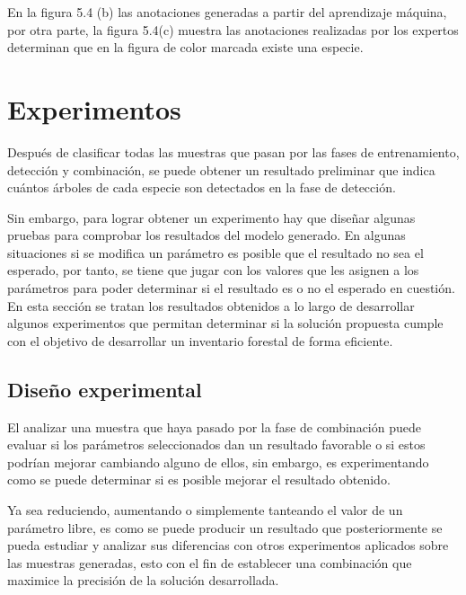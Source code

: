 En la figura 5.4 (b) las anotaciones generadas a partir del aprendizaje máquina, por otra parte, la figura 5.4(c) muestra  las anotaciones realizadas por los expertos determinan que en la figura de color marcada existe una especie.

\chapter{Experimentos}
Después de clasificar todas las muestras que pasan por las fases de entrenamiento, detección y combinación, se puede obtener un resultado preliminar que indica  cuántos árboles de cada especie son detectados en la fase de detección.

Sin embargo, para lograr obtener un experimento hay que diseñar algunas pruebas para comprobar los resultados del modelo generado. En algunas situaciones si se modifica un parámetro es posible que el resultado no sea el esperado, por tanto, se tiene que jugar con los valores que les asignen a los parámetros para poder determinar si el resultado es o no el esperado en cuestión. En esta sección se tratan los resultados obtenidos a lo largo de desarrollar algunos experimentos que permitan determinar si la solución propuesta cumple con el objetivo de desarrollar un inventario forestal de forma eficiente.
\clearpage

\section{Diseño experimental}
El analizar una muestra que haya pasado por la fase de combinación puede evaluar si los parámetros seleccionados dan un resultado favorable o si estos podrían mejorar cambiando alguno de ellos, sin embargo, es experimentando como se puede determinar si es posible mejorar el resultado obtenido. 

Ya sea reduciendo, aumentando o simplemente tanteando el valor de un parámetro libre, es como se puede producir un resultado que posteriormente se pueda estudiar y analizar sus diferencias con otros experimentos aplicados sobre las muestras generadas, esto con el fin de establecer una combinación que maximice la precisión de la solución desarrollada.

